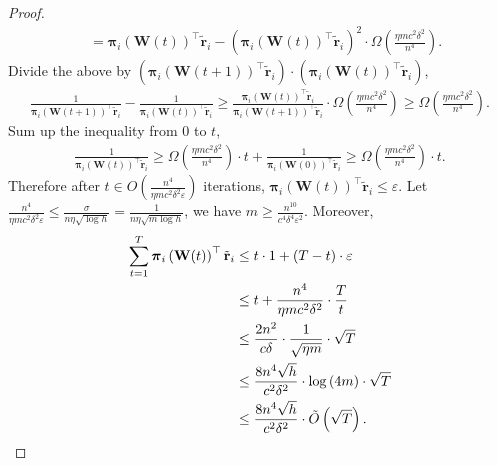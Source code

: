 \documentclass[10pt]{article}
\def\rvtilder{{\tilde{\mathbf{r}}}}
\def\rvpi{{\boldsymbol{\pi}}}
\def\rmW{{\mathbf{W}}}
\begin{document}
\begin{proof}
\begin{equation*}
\begin{split}
    &= \rvpi_i\left( \rmW(t) \right)^\top \rvtilder_i - \left( \rvpi_i\left( \rmW(t) \right)^\top \rvtilder_i \right)^2 \cdot \Omega\left( \frac{\eta m c^2 \delta^2}{n^4} \right).
\end{split}
\end{equation*}
Divide the above by $\left( \rvpi_i\left( \rmW(t+1) \right)^\top \rvtilder_i\right) \cdot \left( \rvpi_i\left( \rmW(t) \right)^\top \rvtilder_i \right)$,
\begin{equation*}
\begin{split}
    \frac{1}{\rvpi_i\left( \rmW(t+1) \right)^\top \rvtilder_i} - \frac{1}{\rvpi_i\left( \rmW(t) \right)^\top \rvtilder_i} \ge \frac{\rvpi_i\left( \rmW(t) \right)^\top \rvtilder_i}{\rvpi_i\left( \rmW(t+1) \right)^\top \rvtilder_i} \cdot \Omega\left( \frac{\eta m c^2 \delta^2}{n^4} \right) \ge \Omega\left( \frac{\eta m c^2 \delta^2}{n^4} \right).
\end{split}
\end{equation*}
Sum up the inequality from $0$ to $t$,
\begin{equation*}
\begin{split}
    \frac{1}{\rvpi_i\left( \rmW(t) \right)^\top \rvtilder_i} \ge \Omega\left( \frac{\eta m c^2 \delta^2}{n^4} \right) \cdot t + \frac{1}{\rvpi_i\left( \rmW(0) \right)^\top \rvtilder_i} \ge \Omega\left( \frac{\eta m c^2 \delta^2}{n^4} \right) \cdot t.
\end{split}
\end{equation*}
Therefore after $t \in O\left( \frac{n^4}{\eta m c^2 \delta^2 \varepsilon} \right)$ iterations, $\rvpi_i\left( \rmW(t) \right)^\top \rvtilder_i \le \varepsilon$. Let $\frac{n^4}{\eta m c^2 \delta^2 \varepsilon} \le \frac{\sigma}{n \eta \sqrt{\log{h}}} = \frac{1}{n \eta \sqrt{m \log{h}}}$, we have $m \ge \frac{n^{10}}{c^4 \delta^4 \varepsilon^2}$. Moreover,
\begin{equation*}
\begin{split}
    \sum\limits_{t=1}^{T}{ \rvpi_i\left( \rmW(t) \right)^\top \rvtilder_i } &\le t \cdot 1 + \left(T - t\right) \cdot \varepsilon \\
    &\le t + \frac{n^4}{\eta m c^2 \delta^2} \cdot \frac{T}{t} \\
    &\le \frac{2 n^2}{c \delta} \cdot \frac{1}{\sqrt{\eta m}} \cdot \sqrt{T} \\
    &\le \frac{8 n^4 \sqrt{h}}{c^2 \delta^2} \cdot \log{\left(4m\right)} \cdot \sqrt{T} \\
    &\le \frac{8 n^4 \sqrt{h}}{c^2 \delta^2} \cdot \tilde{O}\left(\sqrt{T}\right). \qedhere
\end{split}
\end{equation*}
\end{proof}
\end{document}
